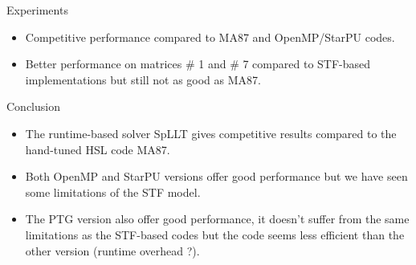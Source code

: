\documentclass[unknownkeysallowed]{beamer}
\newcommand{\db}[1]{\textcolor{mblue}{#1\xspace}}
\newcommand{\dd}[1]{\textcolor{gray!70}{#1\xspace}}
\begin{document}
\begin{frame}{Experiments}
\begin{center}
  \end{center}
  \begin{itemize}
  \item Competitive performance compared to MA87 and OpenMP/StarPU
    codes.
  \item Better performance on matrices \# 1 and \# 7 compared to
    STF-based implementations but still not as good as MA87.
  \end{itemize}
\end{frame}

\begin{frame}{Conclusion}
  \begin{itemize}
  \item The \alert{runtime-based} solver \db{SpLLT} gives competitive
    results compared to the \db{hand-tuned HSL code MA87}.

    \vspace{0.4cm}

  \item Both \alert{OpenMP} and \alert{StarPU} versions offer good
    performance but we have seen some limitations of the \db{STF
      model}.

    \vspace{0.4cm}

  \item The \alert{PTG} version also offer good performance, it
    doesn't suffer from the same limitations as the \alert{STF}-based
    codes but the code seems less efficient than the other version
    (runtime overhead ?).
  \end{itemize}
\end{frame}
\end{document}
